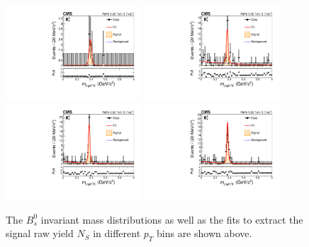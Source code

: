 \begin{figure}[h]
\begin{center}
\includegraphics[width= 0.45\textwidth]{Figures/Chapter4/data_PbPb_1_BptNew_710_doubly0_0_90EffInfoTreeFit.pdf}
\includegraphics[width= 0.45\textwidth]{Figures/Chapter4/data_PbPb_2_BptNew_1015_doubly0_0_90EffInfoTreeFit.pdf}
\includegraphics[width= 0.45\textwidth]{Figures/Chapter4/data_PbPb_3_BptNew_1520_doubly0_0_90EffInfoTreeFit.pdf}
\includegraphics[width= 0.45\textwidth]{Figures/Chapter4/data_PbPb_4_BptNew_2050_doubly0_0_90EffInfoTreeFit.pdf}
\caption{The $B^0_s$ invariant mass distributions as well as the fits to extract the signal raw yield $N_{S}$ in different $p_T$ bins are shown above.}
\label{BsMassPt}
\end{center}
\end{figure}


